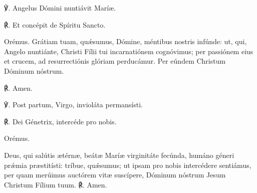 
℣. Angelus Dómini nuntiávit Maríæ.

℟. Et concépit de Spíritu Sancto.

Orémus. 
Grátiam tuam, quǽsumus, Dómine, méntibus nostris infúnde: ut, qui, Angelo nuntiánte, Christi Fílii tui incarnatiónem cognóvimus; per passiónem eius et crucem, ad resurrectiónis glóriam perducámur. Per eúndem Christum Dóminum nóstrum.

℟. Amen.


℣. Post partum, Virgo, invioláta permansísti.

℟. Dei Génetrix, intercéde pro nobis.

Orémus.

Deus, qui salútis ætérnæ, beátæ Maríæ virginitáte fecúnda, humáno géneri prǽmia præstitísti: tríbue, quǽsumus; ut ipsam pro nobis intercédere sentiámus, per quam merúimus auctórem vitæ suscípere, Dóminum nóstrum Jesum Christum Fílium tuum.  ℟. Amen.